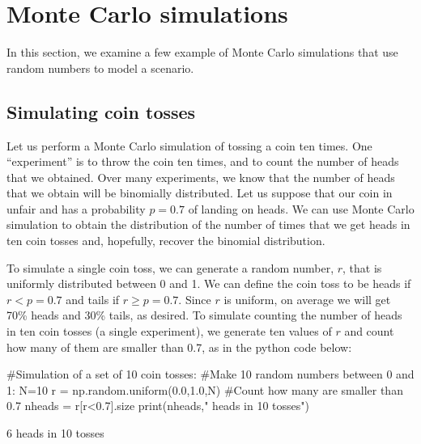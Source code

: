 \section{Monte Carlo simulations}
In this section, we examine a few example of Monte Carlo simulations that use random numbers to model a scenario.
\subsection{Simulating coin tosses}
Let us perform a Monte Carlo simulation of tossing a coin ten times. One ``experiment'' is to throw the coin ten times, and to count the number of heads that we obtained. Over many experiments, we know that the number of heads that we obtain will be binomially distributed. Let us suppose that our coin in unfair and has a probability $p=0.7$ of landing on heads. We can use Monte Carlo simulation to obtain the distribution of the number of times that we get heads in ten coin tosses and, hopefully, recover the binomial distribution.

To simulate a single coin toss, we can generate a random number, $r$, that is uniformly distributed between 0 and 1. We can define the coin toss to be heads if $r<p=0.7$ and tails if $r\geq p= 0.7$. Since $r$ is uniform, on average we will get 70\% heads and 30\% tails, as desired. To simulate counting the number of heads in ten coin tosses (a single experiment), we generate ten values of $r$ and count how many of them are smaller than 0.7, as in the python code below:
\begin{python}[caption = Simulating 10 coin tosses] 
#Simulation of a set of 10 coin tosses:
#Make 10 random numbers between 0 and 1:
N=10
r = np.random.uniform(0.0,1.0,N)
#Count how many are smaller than 0.7
nheads = r[r<0.7].size
print(nheads," heads in 10 tosses")
\end{python}
\begin{poutput}[caption = Note that output is random]
6  heads in 10 tosses
\end{poutput}

